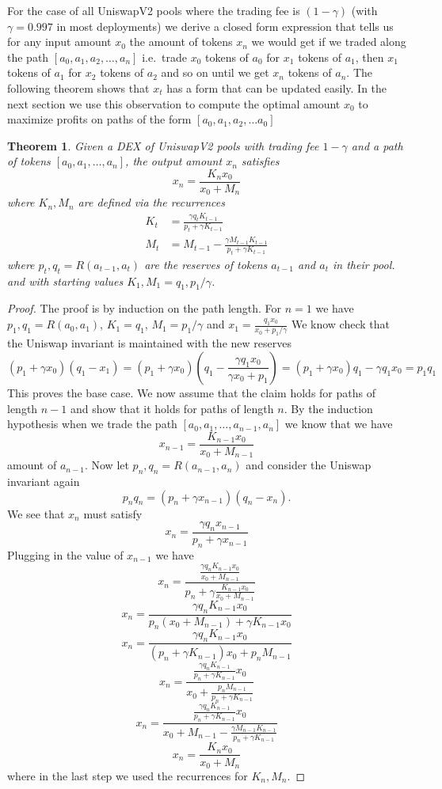 \documentclass{article}
\newtheorem{thm}{Theorem}
\begin{document}
For the case of all UniswapV2 pools where the trading fee is 
$(1-\gamma)$ (with $\gamma = 0.997$ in most deployments) 
we derive a closed form expression that tells us for any 
input amount $x_0$ the amount
of tokens $x_n$ we would get if we traded along 
the path $[a_0,a_1,a_2,\ldots, a_n]$ i.e.\ trade 
$x_0$ tokens of $a_0$ for $x_1$ tokens of $a_1$,
then $x_1$ tokens of $a_1$ for $x_2$ tokens of $a_2$ and so on
until we get $x_n$ tokens of $a_n$. The following theorem 
shows that $x_t$ has a form that can be updated easily.
In the next section we use this observation to compute 
the optimal amount $x_0$ to maximize profits on
paths of the form $[a_0, a_1, a_2,\ldots a_0]$

\begin{thm}
Given a DEX of UniswapV2 pools with trading fee $1-\gamma$ and 
a path of tokens $[a_0, a_1, \ldots, a_n]$, the output amount
$x_n$ satisfies
\begin{equation}
x_n = \frac{K_n x_0}{x_0 + M_n}
\end{equation}
where $K_n, M_n$ are defined 
via the recurrences
\begin{align}
K_{t} &= \frac{\gamma q_t K_{t-1}}{p_t + \gamma K_{t-1}} \\
M_{t} &= M_{t-1} - \frac{\gamma M_{t-1} K_{t-1}}{p_t + \gamma K_{t-1}}
\end{align}
where $p_t,q_t=R(a_{t-1},a_{t})$
are the reserves of 
tokens $a_{t-1}$ and $a_{t}$ in their pool.
and with starting values
$K_1, M_1 = q_1, p_1/\gamma$.
\end{thm}
\begin{proof}
The proof is by induction on the path length. For $n=1$
we have $p_1,q_1=R(a_0,a_1)$, $K_1= q_1$, $M_1 = p_1/\gamma$
and $x_1 = \frac{q_1 x_0}{x_0 + p_1/\gamma}$
We know check that the Uniswap invariant is maintained with the 
new reserves
\[
(p_1+\gamma x_0)(q_1 -x_1) = (p_1+\gamma x_0)\left(q_1 -\frac{\gamma q_1 x_0}{\gamma x_0 + p_1}\right) = (p_1+\gamma x_0)q_1 - \gamma q_1 x_0 = p_1q_1 
\]
This proves the base case. We now assume that the claim holds for paths 
of length $n-1$ and show that it holds for paths of length $n$.
By the induction hypothesis when we trade the path $[a_0,a_1,\ldots,a_{n-1},a_n]$ we know that we have
\[
x_{n-1} = \frac{K_{n-1} x_0}{x_0 + M_{n-1}}
\]
amount of $a_{n-1}$. Now let $p_n,q_n=R(a_{n-1},a_n)$ and consider
the Uniswap invariant again
\[
p_n q_n = (p_n + \gamma x_{n-1})(q_n - x_n).
\]
We see that $x_n$ must satisfy
\[
x_n = \frac{\gamma q_n x_{n-1}}{p_n + \gamma x_{n-1}}
\]
Plugging in the value of $x_{n-1}$ we have
\[
x_{n} =  \frac{\frac{\gamma q_n K_{n-1} x_0}{x_0 + M_{n-1}}}{p_n + \gamma \frac{K_{n-1} x_0}{x_0 + M_{n-1}}}
\]
\[
x_{n} =  \frac{\gamma q_n K_{n-1} x_0}{p_n(x_0 + M_{n-1}) + \gamma K_{n-1} x_0}
\]
\[
x_{n} =  \frac{\gamma q_n K_{n-1} x_0}{(p_n + \gamma K_{n-1} ) x_0 + p_n M_{n-1}}
\]
\[
x_{n} =  \frac{\frac{\gamma q_n K_{n-1}}{p_n + \gamma K_{n-1}} x_0}
{x_0 + \frac{p_n M_{n-1}}{p_n + \gamma K_{n-1}}}
\]
\[
x_{n} =  \frac{\frac{\gamma q_n K_{n-1}}{p_n + \gamma K_{n-1}} x_0}
{x_0 + M_{n-1}-\frac{\gamma M_{n-1} K_{n-1}}{p_n + \gamma K_{n-1}}}
\]
\[
x_{n} =  \frac{K_{n} x_0}{x_0 + M_{n}}
\]
where in the last step we used the recurrences for $K_{n}, M_{n}$. 
\end{proof}
\end{document}
